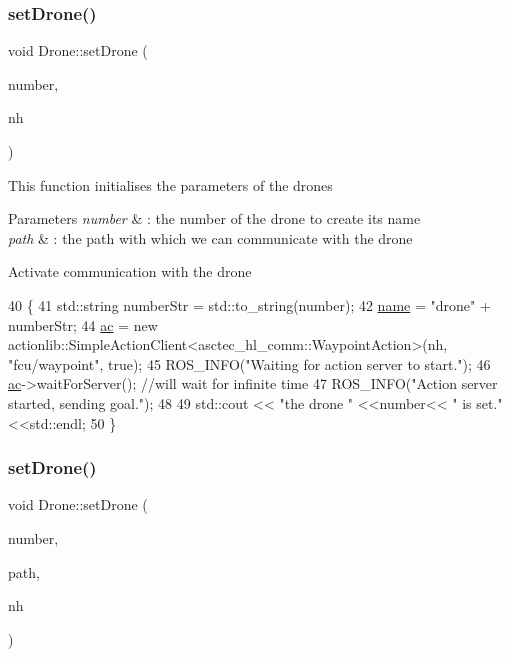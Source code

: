 \mbox{\label{classDrone_a2ce35a5df79f379f6f8d3586d444c3f4}} 
\subsubsection{\texorpdfstring{set\+Drone()}{setDrone()}\hspace{0.1cm}{\footnotesize\ttfamily [1/2]}}
{\footnotesize\ttfamily void Drone\+::set\+Drone (\begin{DoxyParamCaption}\item[{int}]{number,  }\item[{ros\+::\+Node\+Handle}]{nh }\end{DoxyParamCaption})}

This function initialises the parameters of the drones 
\begin{DoxyParams}{Parameters}
{\em number} & \+: the number of the drone to create its name \\
\hline
{\em path} & \+: the path with which we can communicate with the drone \\
\hline
\end{DoxyParams}
Activate communication with the drone 
\begin{DoxyCode}
40 \{
41         std::string numberStr = std::to\_string(number);
42         \hyperlink{classDrone_ac5f6c269378659247acd057142542013}{name} = \textcolor{stringliteral}{"drone"} + numberStr;
44         \hyperlink{classDrone_a767d339ed35d7be9c8ea4709a8dccb47}{ac} = \textcolor{keyword}{new} actionlib::SimpleActionClient<asctec\_hl\_comm::WaypointAction>(nh, \textcolor{stringliteral}{"fcu/waypoint"}, \textcolor{keyword}{true});
45     ROS\_INFO(\textcolor{stringliteral}{"Waiting for action server to start."});
46     \hyperlink{classDrone_a767d339ed35d7be9c8ea4709a8dccb47}{ac}->waitForServer(); \textcolor{comment}{//will wait for infinite time}
47     ROS\_INFO(\textcolor{stringliteral}{"Action server started, sending goal."});
48     
49     std::cout << \textcolor{stringliteral}{"the drone "} <<number<< \textcolor{stringliteral}{" is set."}<<std::endl;
50 \}
\end{DoxyCode}
\mbox{\label{classDrone_a8598b7ea716264e8428a4963a13252fb}} 
\subsubsection{\texorpdfstring{set\+Drone()}{setDrone()}\hspace{0.1cm}{\footnotesize\ttfamily [2/2]}}
{\footnotesize\ttfamily void Drone\+::set\+Drone (\begin{DoxyParamCaption}\item[{int}]{number,  }\item[{std\+::string}]{path,  }\item[{ros\+::\+Node\+Handle}]{nh }\end{DoxyParamCaption})}

